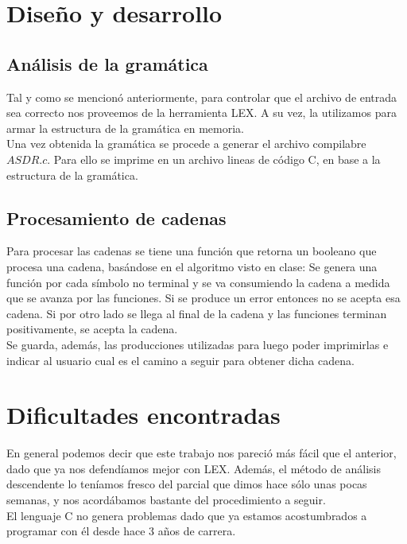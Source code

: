 \documentclass{article}
\begin{document}
\section{Dise\~no y desarrollo}
\subsection{An\'alisis de la gram\'atica}
Tal y como se mencion\'o anteriormente, para controlar que el archivo de entrada sea correcto nos proveemos de la herramienta LEX. A su vez, la utilizamos para armar la estructura de la gram\'atica en memoria.\\
Una vez obtenida la gram\'atica se procede a generar el archivo compilabre $ASDR.c$. Para ello se imprime en un archivo lineas de c\'odigo C, en base a la estructura de la gram\'atica.
\subsection{Procesamiento de cadenas}

Para procesar las cadenas se tiene una funci\'on que retorna un booleano que procesa una cadena, bas\'andose en el algoritmo visto en clase: Se genera una funci\'on por cada s\'imbolo no terminal y se va consumiendo la cadena a medida que se avanza por las funciones. Si se produce un error entonces no se acepta esa cadena. Si por otro lado se llega al final de la cadena y las funciones terminan positivamente, se acepta la cadena.\\
Se guarda, adem\'as, las producciones utilizadas para luego poder imprimirlas e indicar al usuario cual es el camino a seguir para obtener dicha cadena.

\section{Dificultades encontradas}

En general podemos decir que este trabajo nos pareci\'o m\'as f\'acil que el anterior, dado que ya nos defend\'iamos mejor con LEX. Adem\'as, el m\'etodo de an\'alisis descendente lo ten\'iamos fresco del parcial que dimos hace s\'olo unas pocas semanas, y nos acord\'abamos bastante del procedimiento a seguir.\\
El lenguaje C no genera problemas dado que ya estamos acostumbrados a programar con \'el desde hace 3 a\~nos de carrera.
\end{document}
